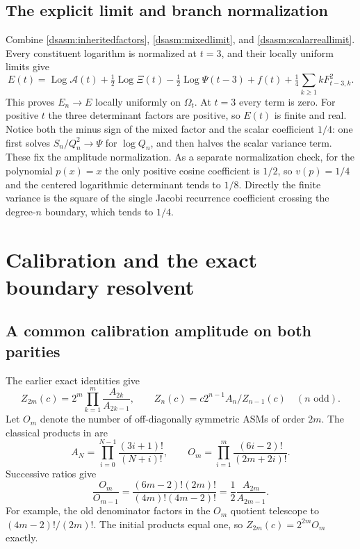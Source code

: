 \documentclass[11pt,letterpaper]{article}
\theoremstyle{remark}\newtheorem{remark}[theorem]{Remark}
\DeclareMathOperator{\Log}{Log}\DeclareMathOperator{\Var}{Var}
\begin{document}
\subsection{The explicit limit and branch normalization}
Combine \eqref{dsasm:inheritedfactors}, \eqref{dsasm:mixedlimit}, and
\eqref{dsasm:scalarreallimit}. Every constituent logarithm is normalized at
$t=3$, and their locally uniform limits give
\begin{equation}\label{dsasm:Eexplicit}
 \boxed{\ E(t)=\Log\mathcal A(t)+\tfrac12\Log\Xi(t)
       -\tfrac12\Log\Psi(t-3)+f(t)
       +\tfrac14\sum_{k\ge1}kF_{t-3,k}^2.\ }
\end{equation}
This proves $E_n\to E$ locally uniformly on $\Omega_t$.
At $t=3$ every term is zero. For positive $t$ the three determinant
factors are positive, so $E(t)$ is finite and real. Notice both the
minus sign of the mixed factor and the scalar coefficient $1/4$:
one first solves $S_n/Q_n^2\to\Psi$ for $\log Q_n$, and then
halves the scalar variance term. These fix the amplitude normalization.
As a separate normalization check, for the polynomial $p(x)=x$ the
only positive cosine coefficient is $1/2$, so $v(p)=1/4$ and the
centered logarithmic determinant tends to $1/8$. Directly the finite
variance is the square of the single Jacobi recurrence coefficient
crossing the degree-$n$ boundary, which tends to $1/4$.
\section{Calibration and the exact boundary resolvent}\label{dsasm:sec:boundary}
\subsection{A common calibration amplitude on both parities}
The earlier exact identities give
\[
 Z_{2m}(c)=2^m\prod_{k=1}^m\frac{A_{2k}}{A_{2k-1}},\qquad
 Z_n(c)=c2^{n-1}A_n/Z_{n-1}(c)\quad(n\text{ odd}).
\]
Let $O_m$ denote the number of off-diagonally symmetric ASMs of
order $2m$. The classical products in \cite{bfk} are
\[
 A_N=\prod_{i=0}^{N-1}\frac{(3i+1)!}{(N+i)!},\qquad
 O_m=\prod_{i=1}^{m}\frac{(6i-2)!}{(2m+2i)!}.
\]
Successive ratios give
\[
 \frac{O_m}{O_{m-1}}
 =\frac{(6m-2)!(2m)!}{(4m)!(4m-2)!}
 =\frac12\frac{A_{2m}}{A_{2m-1}}.
\]
For example, the old denominator factors in the $O_m$ quotient
telescope to $(4m-2)!/(2m)!$. The initial products equal one,
so $Z_{2m}(c)=2^{2m}O_m$ exactly.
\end{document}
